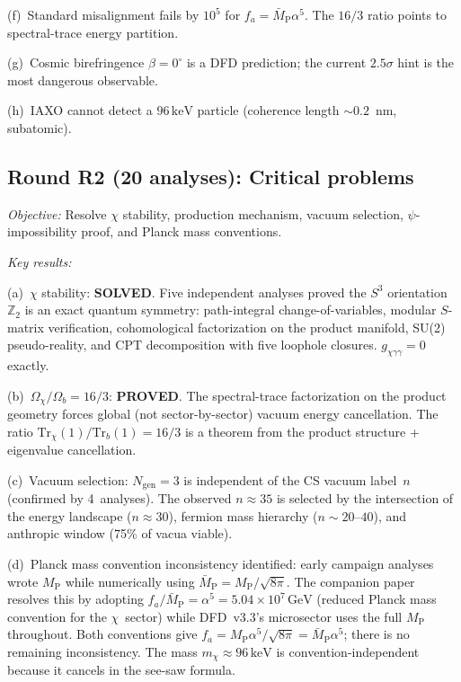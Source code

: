 \documentclass[aps,prd,twocolumn,superscriptaddress,nofootinbib]{revtex4-2}
\newcommand{\Sph}{S}
\newcommand{\keV}{\,\mathrm{keV}}
\newcommand{\GeV}{\,\mathrm{GeV}}
\newcommand{\MPbar}{\bar{M}_{\mathrm{P}}}
\begin{document}
(f)~Standard misalignment fails by $10^5$ for
$f_a = \bar M_{\mathrm{P}}\alpha^5$. The $16/3$ ratio
points to spectral-trace energy partition.

(g)~Cosmic birefringence $\beta = 0^\circ$ is a DFD
prediction; the current $2.5\sigma$ hint is the most
dangerous observable.

(h)~IAXO cannot detect a $96\keV$ particle (coherence
length ${\sim}0.2$~nm, subatomic).

\subsection{Round R2 (20 analyses): Critical problems}

\emph{Objective:} Resolve $\chi$ stability, production
mechanism, vacuum selection, $\psi$-impossibility
proof, and Planck mass conventions.

\emph{Key results:}

(a)~$\chi$ stability: \textbf{SOLVED}. Five independent
analyses proved the $\Sph^3$ orientation $\mathbb{Z}_2$
is an exact quantum symmetry: path-integral
change-of-variables, modular $S$-matrix verification,
cohomological factorization on the product manifold,
SU(2) pseudo-reality, and CPT decomposition with five
loophole closures. $g_{\chi\gamma\gamma} = 0$ exactly.

(b)~$\Omega_\chi/\Omega_b = 16/3$: \textbf{PROVED}.
The spectral-trace factorization on the product geometry
forces global (not sector-by-sector) vacuum energy
cancellation. The ratio
$\mathrm{Tr}_\chi(1)/\mathrm{Tr}_b(1) = 16/3$ is a
theorem from the product structure + eigenvalue
cancellation.

(c)~Vacuum selection: $N_{\mathrm{gen}} = 3$ is
independent of the CS vacuum label~$n$ (confirmed by
4~analyses). The observed $n\approx 35$ is selected by
the intersection of the energy landscape ($n\approx 30$),
fermion mass hierarchy ($n\sim 20$--$40$), and anthropic
window (75\% of vacua viable).

(d)~Planck mass convention inconsistency identified:
early campaign analyses wrote $M_{\mathrm{P}}$ while
numerically using $\MPbar = M_{\mathrm{P}}/\sqrt{8\pi}$.
The companion paper resolves this by adopting
$f_a/\MPbar = \alpha^5 = 5.04\times 10^7\GeV$
(reduced Planck mass convention for the $\chi$~sector)
while DFD~v3.3's microsector uses the full
$M_{\mathrm{P}}$ throughout. Both conventions give
$f_a = M_{\mathrm{P}}\alpha^5/\sqrt{8\pi}
= \MPbar\alpha^5$; there is no remaining inconsistency.
The mass $m_\chi \approx 96\keV$ is convention-independent
because it cancels in the see-saw formula.
\end{document}
